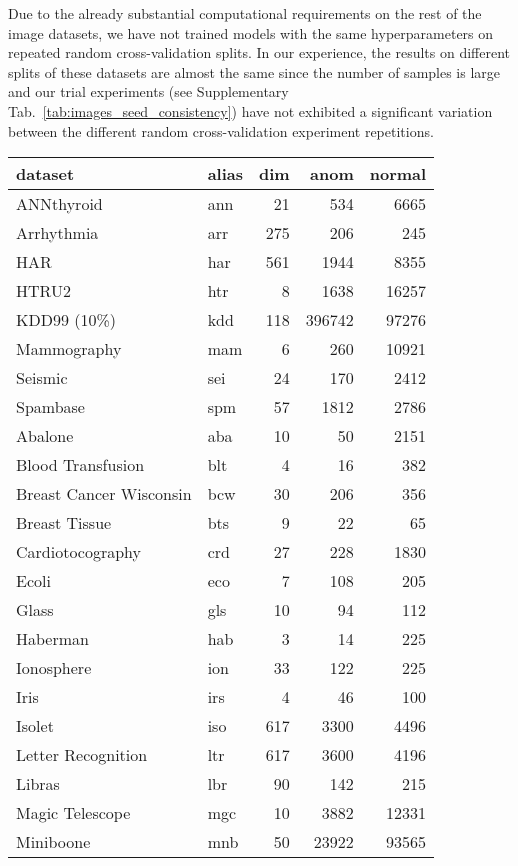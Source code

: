 Due to the already substantial computational requirements on the rest of the image datasets, we have not trained models with the same hyperparameters on repeated random cross-validation splits. In our experience, the results on different splits of these datasets are almost the same since the number of samples is large and our trial experiments (see Supplementary Tab.~\ref{tab:images_seed_consistency}) have not exhibited a significant variation between the different random cross-validation experiment repetitions. 

\begin{table}
\centering
\tabcolsep=0.1cm
\begin{tabular}{llrrr}
\toprule
\textbf{dataset} & \textbf{alias} & \textbf{dim} & \textbf{anom} & \textbf{normal}   \\\midrule
ANNthyroid & ann  & 21 & 534 & 6665 \\
Arrhythmia & arr  & 275 & 206 & 245 \\
HAR & har & 561 & 1944 & 8355  \\
HTRU2 & htr & 8 & 1638 & 16257  \\
KDD99 (10\%) & kdd & 118 & 396742 & 97276  \\
Mammography & mam & 6 & 260 & 10921  \\
Seismic & sei  & 24 & 170 & 2412  \\
Spambase & spm & 57 & 1812 & 2786  \\
\midrule
Abalone & aba & 10 & 50 & 2151  \\
Blood Transfusion & blt & 4 & 16 & 382  \\
Breast Cancer Wisconsin & bcw  & 30 & 206 & 356 \\
Breast Tissue & bts & 9 & 22 & 65 \\
Cardiotocography & crd & 27 & 228 & 1830  \\
Ecoli & eco & 7 & 108 & 205  \\
Glass & gls & 10 & 94 & 112  \\
Haberman & hab & 3 & 14 & 225  \\
Ionosphere & ion & 33 & 122 & 225  \\
Iris & irs & 4 & 46 & 100  \\
Isolet & iso & 617 & 3300 & 4496  \\
Letter Recognition & ltr & 617 & 3600 & 4196  \\
Libras & lbr & 90 & 142 & 215  \\
Magic Telescope & mgc & 10 & 3882 & 12331  \\
Miniboone & mnb & 50 & 23922 & 93565  \\

\end{tabular}
\end{table}
